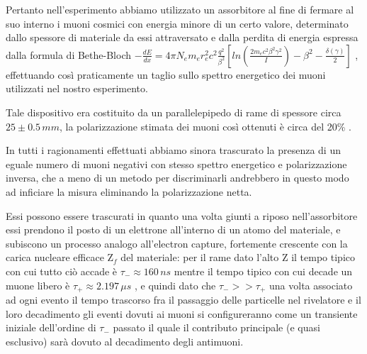 Pertanto nell'esperimento abbiamo utilizzato un assorbitore al fine di fermare al suo interno i muoni cosmici con energia minore di un certo valore, determinato dallo spessore di materiale da essi attraversato e dalla perdita di energia espressa dalla formula di Bethe-Bloch $-\frac{dE}{dx}=4\pi N_e m_e r_e^2 c^2 \frac{q^2}{\beta^2}[ln(\frac{2m_e c^2 \beta^2 \gamma^2}{I})-\beta^2-\frac{\delta(\gamma)}{2}]$ , effettuando così praticamente un taglio sullo spettro energetico dei muoni utilizzati nel nostro esperimento. \par
Tale dispositivo era costituito da un parallelepipedo di rame di spessore circa $25\pm0.5 \, mm$, la polarizzazione stimata dei muoni così ottenuti è circa del 20\% .\par
In tutti i ragionamenti effettuati abbiamo sinora trascurato la presenza di un eguale numero di muoni negativi con stesso spettro energetico e polarizzazione inversa, che a meno di un metodo per discriminarli andrebbero in questo modo ad inficiare la misura eliminando la polarizzazione netta. \par
Essi possono essere trascurati in quanto una volta giunti a riposo nell'assorbitore essi prendono il posto di un elettrone all'interno di un atomo del materiale, e subiscono un  processo analogo all'electron capture, fortemente crescente con la carica nucleare efficace Z$_f$ del materiale: per il rame dato l'alto Z il tempo tipico con cui tutto ciò accade è $\tau_-\approx 160 \, ns$ \cite{bib:Suzuki:1987jf} mentre il tempo tipico con cui decade un muone libero è $\tau_+\approx 2.197 \, \mu s$ \cite{bib:Patrignani:2016xqp}, e quindi dato che $\tau_->>\tau_+$ una volta associato ad ogni evento il tempo trascorso fra il passaggio delle particelle nel rivelatore e il loro decadimento gli eventi dovuti ai muoni si configureranno come un transiente iniziale dell'ordine di $\tau_-$ passato il quale il contributo principale (e quasi esclusivo) sarà dovuto al decadimento degli antimuoni. \par


